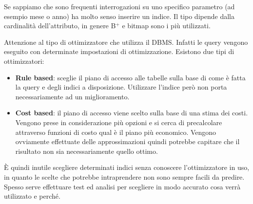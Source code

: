 Se sappiamo che sono frequenti interrogazioni su uno specifico parametro (ad esempio mese o anno) ha molto senso inserire un indice. Il tipo dipende dalla cardinalità dell'attributo, in genere B$^{+}$ e bitmap sono i più utilizzati.

Attenzione al tipo di ottimizzatore che utilizza il DBMS. Infatti le query vengono eseguito con determinate impostazioni di ottimizzazione. Esistono due tipi di ottimizzatori:
\begin{itemize}
	\item \textbf{Rule based}: sceglie il piano di accesso alle tabelle sulla base di come è fatta la query e degli indici a disposizione. Utilizzare l'indice però non porta necessariamente ad un miglioramento.
	\item \textbf{Cost based}: il piano di accesso viene scelto sulla base di una stima dei costi. Vengono prese in considerazione più opzioni e si cerca di precalcolare attraverso funzioni di costo qual è il piano più economico. Vengono ovviamente effettuate delle approssimazioni quindi potrebbe capitare che il risultato non sia necessariamente quello ottimo.
\end{itemize}
È quindi inutile scegliere determinati indici senza conoscere l'ottimizzatore in uso, in quanto le scelte che potrebbe intraprendere non sono sempre facili da predire. Spesso serve effettuare test ed analisi per scegliere in modo accurato cosa verrà utilizzato e perché.
